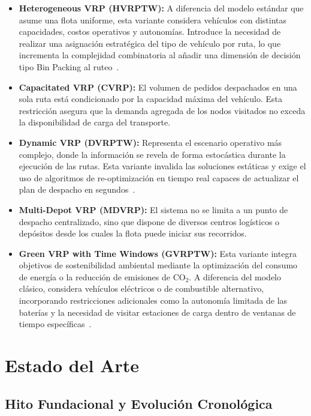 \documentclass[letter, 10pt]{article}
\begin{document}
\begin{itemize}
\item \textbf{Heterogeneous VRP (HVRPTW):} A diferencia del modelo est\'andar que asume una flota uniforme, esta variante considera veh\'iculos con distintas capacidades, costos operativos y autonom\'ias. Introduce la necesidad de realizar una asignaci\'on estrat\'egica del tipo de veh\'iculo por ruta, lo que incrementa la complejidad combinatoria al a\~nadir una dimensi\'on de decisi\'on tipo Bin Packing al ruteo~\cite{baldacci2008heterogeneous}.
\item \textbf{Capacitated VRP (CVRP):} El volumen de pedidos despachados en una sola ruta est\'a condicionado por la capacidad m\'axima del veh\'iculo. Esta restricci\'on asegura que la demanda agregada de los nodos visitados no exceda la disponibilidad de carga del transporte.
\item \textbf{Dynamic VRP (DVRPTW):} Representa el escenario operativo m\'as complejo, donde la informaci\'on se revela de forma estoc\'astica durante la ejecuci\'on de las rutas. Esta variante invalida las soluciones est\'aticas y exige el uso de algoritmos de re-optimizaci\'on en tiempo real capaces de actualizar el plan de despacho en segundos~\cite{psaraftis2016dynamic}.
\item \textbf{Multi-Depot VRP (MDVRP):} El sistema no se limita a un punto de despacho centralizado, sino que dispone de diversos centros log\'isticos o dep\'ositos desde los cuales la flota puede iniciar sus recorridos.
\item \textbf{Green VRP with Time Windows (GVRPTW):} Esta variante integra objetivos de sostenibilidad ambiental mediante la optimizaci\'on del consumo de energ\'ia o la reducci\'on de emisiones de CO$_2$. A diferencia del modelo cl\'asico, considera veh\'iculos el\'ectricos o de combustible alternativo, incorporando restricciones adicionales como la autonom\'ia limitada de las bater\'ias y la necesidad de visitar estaciones de carga dentro de ventanas de tiempo espec\'ificas~\cite{schneider2014electric}.
\end{itemize}

\section{Estado del Arte}

\subsection{Hito Fundacional y Evoluci\'on Cronol\'ogica}
\end{document}
